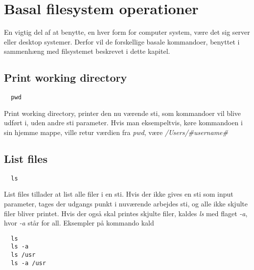 \chapter{Basal filesystem operationer}
En vigtig del af at benytte, en hver form for computer system, være det sig server eller desktop systemer.
Derfor vil de forskellige basale kommandoer, benyttet i sammenhæng med filsystemet beskrevet i dette kapitel.
\section{Print working directory}
\begin{lstlisting}
  pwd
\end{lstlisting}
Print working directory, printer den nu værende sti, som kommandoer vil blive udført i, uden andre sti parameter.
Hvis man eksempeltvis, køre kommandoen i sin hjemme mappe, ville retur værdien fra \emph{pwd}, være \emph{/Users/\#username\#}

\section{List files}
\begin{lstlisting}
  ls
\end{lstlisting}
List files tillader at list alle filer i en sti. Hvis der ikke gives en sti som input parameter, tages der udgangs punkt
i nuværende arbejdes sti, og alle ikke skjulte filer bliver printet. Hvis der også skal printes skjulte filer, kaldes
\emph{ls} med flaget \emph{-a}, hvor \emph{-a} står for all. Eksempler på kommando kald
\begin{lstlisting}
  ls
  ls -a
  ls /usr
  ls -a /usr
\end{lstlisting}
